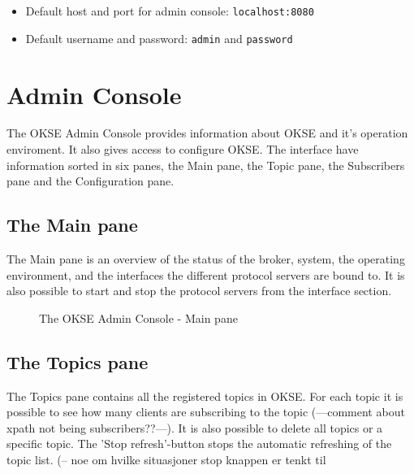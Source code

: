 \begin{itemize}
\setlength{\itemsep}{0cm}%
\item Default host and port for admin console: \verb!localhost:8080!
\item Default username and password: \verb!admin! and \verb!password!
\end{itemize}

\section{Admin Console}
The OKSE Admin Console provides information about OKSE and it's operation enviroment. It also gives access to configure OKSE. The interface have information sorted in six panes, the Main pane, the Topic pane, the Subscribers pane and the Configuration pane.

\subsection{The Main pane}
The Main pane is an overview of the status of the broker, system, the operating environment, and the interfaces the different protocol servers are bound to. It is also possible to start and stop the protocol servers from the interface section.

\begin{center}
  \begin{figure}[ht!]
    \caption{The OKSE Admin Console - Main pane} 
    \label{fig:OKSE Admin Console - Main pane}
  \end{figure}
\end{center}

\subsection{The Topics pane}
The Topics pane contains all the registered topics in OKSE. For each topic it is possible to see how many clients are subscribing to the topic (---comment about xpath not being subscribers??---). It is also possible to delete all topics or a specific topic. The 'Stop refresh'-button stops the automatic refreshing of the topic list. (-- noe om hvilke situasjoner stop knappen er tenkt til

